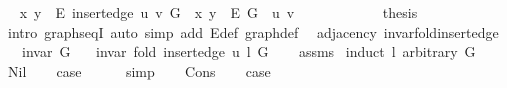 \begin{isabellebody}
\ \isamarkupfalse%
\ {\isachardoublequoteopen}{\isacharbraceleft}{\kern0pt}x{\isacharcomma}{\kern0pt}\ y{\isacharbraceright}{\kern0pt}\ {\isasymin}\ E\ {\isacharparenleft}{\kern0pt}insert{\isacharunderscore}{\kern0pt}edge\ u\ v\ G{\isacharparenright}{\kern0pt}\ {\isasymlongleftrightarrow}\ {\isacharbraceleft}{\kern0pt}x{\isacharcomma}{\kern0pt}\ y{\isacharbraceright}{\kern0pt}\ {\isasymin}\ E\ G\ {\isasymunion}\ {\isacharbraceleft}{\kern0pt}{\isacharbraceleft}{\kern0pt}u{\isacharcomma}{\kern0pt}\ v{\isacharbraceright}{\kern0pt}{\isacharbraceright}{\kern0pt}{\isachardoublequoteclose}\isanewline
\ \ \ \ \ \ \isacommand{{\isachardot}{\kern0pt}}\isamarkupfalse%
\ \isacommand{{\isacharbraceright}{\kern0pt}}\isamarkupfalse%
\isanewline
\ \ \isamarkupfalse%
\ {\isacharquery}{\kern0pt}thesis\isanewline
\ \ \ \ \isamarkupfalse%
\ {\isacharparenleft}{\kern0pt}intro\ graphs{\isacharunderscore}{\kern0pt}eqI{\isacharparenright}{\kern0pt}\ {\isacharparenleft}{\kern0pt}auto\ simp\ add{\isacharcolon}{\kern0pt}\ E{\isacharunderscore}{\kern0pt}def\ graph{\isacharunderscore}{\kern0pt}def{\isacharparenright}{\kern0pt}\isanewline
{}\isamarkupfalse%
%
\endisatagproof
{\isafoldproof}%
%
\isadelimproof
\isanewline
%
\endisadelimproof
\isanewline
{}\isamarkupfalse%
\ {\isacharparenleft}{\kern0pt}\ adjacency{\isacharparenright}{\kern0pt}\ invar{\isacharunderscore}{\kern0pt}fold{\isacharunderscore}{\kern0pt}insert{\isacharunderscore}{\kern0pt}edge{\isacharcolon}{\kern0pt}\isanewline
\ \ \ {\isachardoublequoteopen}invar\ G{\isachardoublequoteclose}\isanewline
\ \ \ {\isachardoublequoteopen}invar\ {\isacharparenleft}{\kern0pt}fold\ {\isacharparenleft}{\kern0pt}insert{\isacharunderscore}{\kern0pt}edge\ u{\isacharparenright}{\kern0pt}\ l\ G{\isacharparenright}{\kern0pt}{\isachardoublequoteclose}\isanewline
%
\isadelimproof
\ \ %
\endisadelimproof
%
\isatagproof
{}\isamarkupfalse%
\ assms\isanewline
{}\isamarkupfalse%
\ {\isacharparenleft}{\kern0pt}induct\ l\ arbitrary{\isacharcolon}{\kern0pt}\ G{\isacharparenright}{\kern0pt}\isanewline
\ \ \isamarkupfalse%
\ Nil\isanewline
\ \ \isamarkupfalse%
\ {\isacharquery}{\kern0pt}case\isanewline
\ \ \ \ \isamarkupfalse%
\ simp\isanewline
{}\isamarkupfalse%
\isanewline
\ \ \isamarkupfalse%
\ Cons\isanewline
\ \ \isamarkupfalse%
\ {\isacharquery}{\kern0pt}case\isanewline
\ \ \ \ \isamarkupfalse%

\end{isabellebody}

